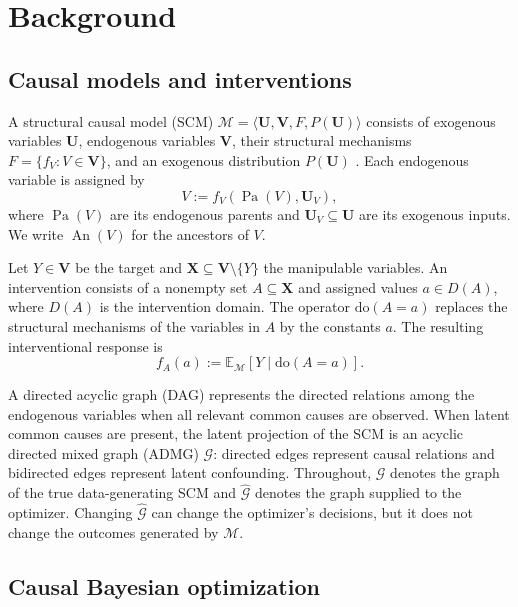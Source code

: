 \documentclass[twoside]{article}
\newcommand{\E}{\mathbb{E}}
\newcommand{\doo}{\mathrm{do}}
\newcommand{\Gg}{\mathcal{G}}
\begin{document}
\section{Background}
\label{sec:background}
\label{sec:setup}

\subsection{Causal models and interventions}

A structural causal model (SCM) \(\mathcal M=\langle\mathbf U,\mathbf V,F,P(\mathbf U)\rangle\) consists of exogenous variables \(\mathbf U\), endogenous variables \(\mathbf V\), their structural mechanisms \(F=\{f_V:V\in\mathbf V\}\), and an exogenous distribution \(P(\mathbf U)\) \citep{pearlCausality2009}. Each endogenous variable is assigned by
\[
 V:=f_V\!\left(\operatorname{Pa}(V),\mathbf U_V\right),
\]
where \(\operatorname{Pa}(V)\) are its endogenous parents and \(\mathbf U_V\subseteq\mathbf U\) are its exogenous inputs. We write \(\operatorname{An}(V)\) for the ancestors of \(V\).

Let \(Y\in\mathbf V\) be the target and \(\mathbf X\subseteq\mathbf V\setminus\{Y\}\) the manipulable variables. An intervention consists of a nonempty set \(A\subseteq\mathbf X\) and assigned values \(a\in D(A)\), where \(D(A)\) is the intervention domain. The operator \(\doo(A=a)\) replaces the structural mechanisms of the variables in \(A\) by the constants \(a\). The resulting interventional response is
\begin{equation}
 f_A(a):=\E_{\mathcal M}[Y\mid\doo(A=a)].
 \label{eq:arm-value}
\end{equation}

A directed acyclic graph (DAG) represents the directed relations among the endogenous variables when all relevant common causes are observed. When latent common causes are present, the latent projection of the SCM is an acyclic directed mixed graph (ADMG) \(\Gg\): directed edges represent causal relations and bidirected edges represent latent confounding. Throughout, \(\Gg\) denotes the graph of the true data-generating SCM and \(\widehat{\Gg}\) denotes the graph supplied to the optimizer. Changing \(\widehat{\Gg}\) can change the optimizer's decisions, but it does not change the outcomes generated by \(\mathcal M\).

\subsection{Causal Bayesian optimization}
\end{document}
